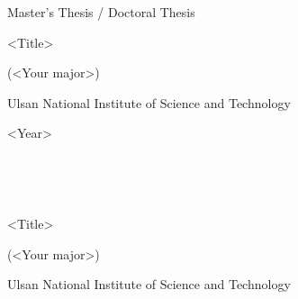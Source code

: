 \documentclass[11pt,a4paper,onecolumn,oneside]{report}
\begin{document}


\begin{center}
\LARGE Master's Thesis / Doctoral Thesis

\vspace{3cm}
\huge <Title>

\vfill


\vspace{2cm}


\LARGE (<Your major>)

\vspace{2cm}

\LARGE Ulsan National Institute of Science and Technology
\vspace{2cm}

\LARGE <Year>

\end{center}
\thispagestyle{empty}
\clearpage

\begin{center}
\hbox{ }

\hbox{ }

\huge <Title> 

\vspace{5cm}


\vspace{6cm}


\LARGE (<Your major>)

\vspace{2cm}

\LARGE Ulsan National Institute of Science and Technology

\end{center}
\thispagestyle{empty}
\clearpage
\end{document}
